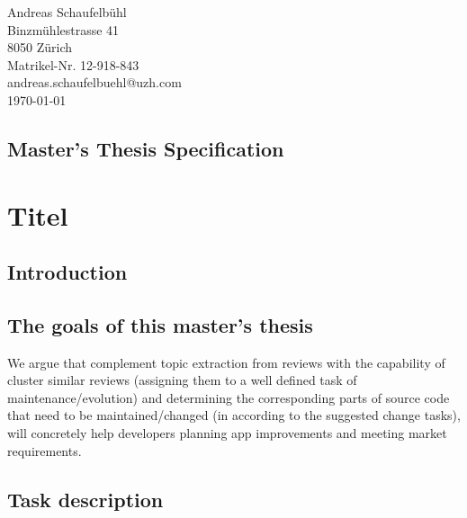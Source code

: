 \documentclass{task_description}
\begin{document}
\thispagestyle{firstpage}
\vspace*{23mm}%
\hfill\parbox[t]{65mm}{

Andreas Schaufelb\"uhl\\
Binzm\"uhlestrasse 41\\
8050 Z\"urich\\[5mm]
Matrikel-Nr. 12-918-843\\
andreas.schaufelbuehl@uzh.com\\[15mm]
\today \\
}
\vspace*{5mm}
\subsection*{Master's Thesis Specification}
%

\section*{Titel}


%
\subsection*{Introduction}
%



\newpage

\subsection*{The goals of this master's thesis}
We argue that complement topic extraction from reviews with the capability of cluster similar reviews (assigning them to a well defined task of maintenance/evolution) and
  determining the corresponding parts of source code that need to be maintained/changed (in according to the suggested change tasks),  will concretely help developers planning app improvements and meeting market requirements.
  
      
      

\subsection*{Task description}
%
\end{document}
